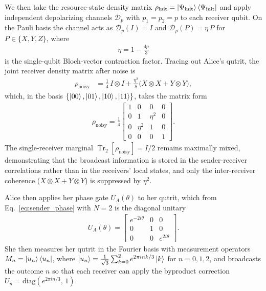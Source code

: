 \documentclass[aps,physrev,10pt,twocolumn,superscriptaddress,floatfix]{revtex4-2}
\DeclareMathOperator{\Tr}{Tr}
\begin{document}
We then take the resource-state density matrix $\rho_{\text{init}} = \ket{\Psi_{\text{init}}}\bra{\Psi_{\text{init}}}$ and apply independent depolarizing channels $\mathcal{D}_p$ with $p_1 = p_2 = p$ to each receiver qubit. On the Pauli basis the channel acts as $\mathcal{D}_p(I)=I$ and $\mathcal{D}_p(P)=\eta\,P$ for $P\in\{X,Y,Z\}$, where
\begin{align}
    \eta = 1 - \tfrac{4p}{3}
\end{align}
is the single-qubit Bloch-vector contraction factor. Tracing out Alice's qutrit, the joint receiver density matrix after noise is
\begin{align}
    \rho_{\text{noisy}} &= \tfrac{1}{4}\, I\!\otimes\!I + \tfrac{\eta^2}{8}\big(X\!\otimes\!X + Y\!\otimes\!Y\big),
\end{align}
which, in the basis $\{\ket{00},\ket{01},\ket{10},\ket{11}\}$, takes the matrix form
\begin{align}
    \rho_{\text{noisy}} = \frac{1}{4}\begin{bmatrix}
    1 & 0 & 0 & 0 \\
    0 & 1 & \eta^2 & 0 \\
    0 & \eta^2 & 1 & 0 \\
    0 & 0 & 0 & 1
    \end{bmatrix}.
\end{align}
The single-receiver marginal $\Tr_2[\rho_{\text{noisy}}] = I/2$ remains maximally mixed, demonstrating that the broadcast information is stored in the sender-receiver correlations rather than in the receivers' local states, and only the inter-receiver coherence ($X\!\otimes\!X + Y\!\otimes\!Y$) is suppressed by $\eta^2$.

Alice then applies her phase gate $U_A(\theta)$ to her qutrit, which from Eq.~\eqref{eq:sender_phase} with $N=2$ is the diagonal unitary
\begin{align}
    U_A(\theta) = \begin{bmatrix}
        e^{-2i\theta} & 0 & 0 \\
        0 & 1 & 0 \\
        0 & 0 & e^{2i\theta}
        \end{bmatrix}.
\end{align}
She then measures her qutrit in the Fourier basis with measurement operators $M_n = \ket{u_n}\bra{u_n}$, where $\ket{u_n} = \frac{1}{\sqrt{3}}\sum_{k=0}^2 e^{2\pi i nk/3}\ket{k}$ for $n=0,1,2$, and broadcasts the outcome $n$ so that each receiver can apply the byproduct correction $U_n = \mathrm{diag}(e^{2\pi i n/3},\,1)$.
\end{document}
